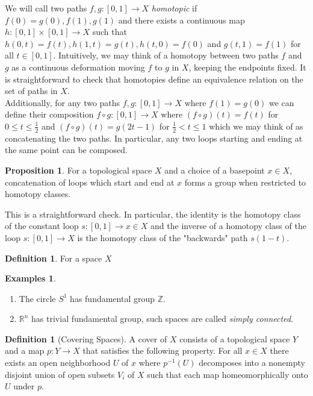 \documentclass{article}
\theoremstyle{definition}
\newtheorem{proposition}[theorem]{Proposition}
\newtheorem{definition}[theorem]{Definition}
\newtheorem{examples}[theorem]{Examples}
\theoremstyle{remark}
\newcommand{\R}{\mathbb{R}}
\newcommand{\Z}{\mathbb{Z}}
\begin{document}
We will call two paths $f,g: [0,1] \to X$ \textit{homotopic} if $f(0) = g(0), f(1), g(1)$ and there exists a continuous map $h: [0,1] \times [0,1] \to X$ such that $h(0,t) = f(t), h(1,t) = g(t), h(t,0) = f(0)$ and $g(t,1) = f(1)$ for all $t \in [0,1]$.
Intuitively, we may think of a homotopy between two paths $f$ and $g$ as a continuous deformation moving $f$ to $g$ in $X$, keeping the endpoints fixed. 
It is straightforward to check that homotopies define an equivalence relation on the set of paths in $X$.\\
\indent Additionally, for any two paths $f,g: [0,1] \to X$ where $f(1) = g(0)$ we can define their composition $f \circ g: [0,1] \to X$ where $(f \circ g )(t) = f(t)$ for $0 \leq t \leq \frac{1}{2}$ and $(f \circ g)(t) = g(2t - 1)$ for $ \frac{1}{2} < t \leq 1$ which we may think of as concatenating the two paths.
In particular, any two loops starting and ending at the same point can be composed.

\begin{proposition}
	For a topological space $X$ and a choice of a basepoint $x \in X$, concatenation of loops which start and end at $x$ forms a group when restricted to homotopy classes.
\end{proposition}

This is a straightforward check. 
In particular, the identity is the homotopy class of the constant loop $s: [0,1] \to x \in X$ and the inverse of a homotopy class of the loop $s: [0,1] \to X$ is the homotopy class of the "backwards" path $s(1-t)$.

\begin{definition}
	For a space $X$ 	
\end{definition}

\begin{examples} \text{}
	\begin{enumerate}
		\item The circle $S^1$ has fundamental group $\Z$.
		\item $\R^n$ has trivial fundamental group, such spaces are called \textit{simply connected}.
	\end{enumerate}
	
\end{examples}

\begin{definition}[Covering Spaces]
	A cover of $X$ consists of a topological space $Y$ and a map $p:Y \to X$ that satisfies the following property. 
	For all $x \in X$ there exists an open neighborhood $U$ of $x$ where $p^{-1}(U)$ decomposes into a nonempty disjoint union of open subsets $V_i$ of $X$ such that each map homeomorphically onto $U$ under $p$.
\end{definition}
\end{document}
